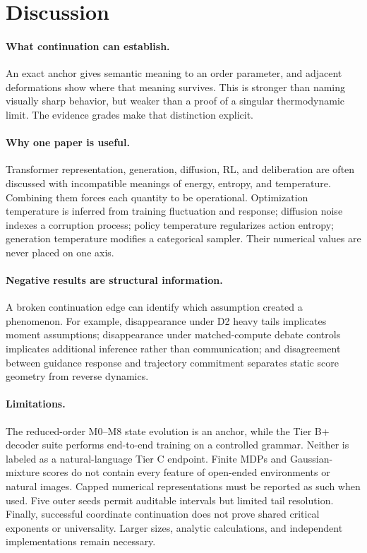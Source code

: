 \section{Discussion}

\paragraph{What continuation can establish.}
An exact anchor gives semantic meaning to an order parameter, and adjacent deformations
show where that meaning survives. This is stronger than naming visually sharp behavior,
but weaker than a proof of a singular thermodynamic limit. The evidence grades make that
distinction explicit.

\paragraph{Why one paper is useful.}
Transformer representation, generation, diffusion, RL, and deliberation are often discussed
with incompatible meanings of energy, entropy, and temperature. Combining them forces
each quantity to be operational. Optimization temperature is inferred from training
fluctuation and response; diffusion noise indexes a corruption process; policy temperature
regularizes action entropy; generation temperature modifies a categorical sampler. Their
numerical values are never placed on one axis.

\paragraph{Negative results are structural information.}
A broken continuation edge can identify which assumption created a phenomenon. For
example, disappearance under D2 heavy tails implicates moment assumptions; disappearance
under matched-compute debate controls implicates additional inference rather than
communication; and disagreement between guidance response and trajectory commitment
separates static score geometry from reverse dynamics.

\paragraph{Limitations.}
The reduced-order M0--M8 state evolution is an anchor, while the Tier B+ decoder suite performs end-to-end training on a controlled grammar. Neither is labeled as a natural-language Tier C endpoint. Finite MDPs and Gaussian-mixture scores do not contain every feature
of open-ended environments or natural images. Capped numerical representations must be
reported as such when used. Five outer seeds permit auditable intervals but limited tail
resolution. Finally, successful coordinate continuation does not prove shared critical
exponents or universality. Larger sizes, analytic calculations, and independent
implementations remain necessary.

